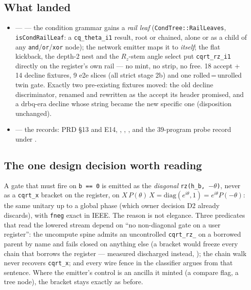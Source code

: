 \subsection*{What landed}
\begin{itemize}
  \item {} ---  --- the condition grammar gains a \emph{rail leaf}
    (\texttt{CondTree::RailLeaves}, \texttt{isCondRailLeaf}: a \texttt{cq\_theta\_i1} result, root or
    chained, alone or as a child of any \texttt{and}/\texttt{or}/\texttt{xor} node); the network
    emitter maps it to \emph{itself}; the flat kickback, the depth-2 nest and the \(R_z\)-stem angle
    select put \texttt{cqrt\_rz\_i1} directly on the register's own rail --- no mint, no strip, no
    free. 18 accept + 14 decline fixtures, 9 e2e slices (all strict stage 2b) and one rolled\,=\,unrolled
    twin gate. Exactly two pre-existing fixtures moved: the old decline discriminator, renamed and
    rewritten as the accept its header promised, and a drbq-era decline whose string became
    the new specific one (disposition unchanged).
  \item {} --- the records: PRD \S13 and E14, , ,
    , and the 39-program probe record under
    .
\end{itemize}

\subsection*{The one design decision worth reading}
A gate that must fire on \texttt{b == 0} is emitted as the \emph{diagonal} \texttt{rz(h\_b, }\(-\theta\)\texttt{)},
never as a \texttt{cqrt\_x} bracket on the register, on
\(X\,P(\theta)\,X = \mathrm{diag}(e^{i\theta},1) = e^{i\theta}P(-\theta)\): the same unitary up to a
global phase (which owner decision D2 already discards), with \texttt{fneg} exact in IEEE. The reason
is not elegance. Three predicates that read the lowered stream depend on ``no non-diagonal gate on a
user register'': the uncompute spine admits an uncontrolled \texttt{cqrt\_rz\_} on a borrowed parent
by name and fails closed on anything else (a bracket would freeze every chain that borrows the
register --- measured discharged instead, ); the
chain walk never recovers \texttt{cqrt\_x}; and every wire fence in the classifier argues from that
sentence. Where the emitter's control is an ancilla it minted (a compare flag, a tree node), the
bracket stays exactly as before.

